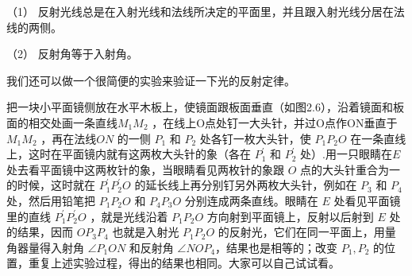 （1）
反射光线总是在入射光线和法线所决定的平面里，并且跟入射光线分居在法线的两侧。

（2） 反射角等于入射角。

我们还可以做一个很简便的实验来验证一下光的反射定律。

把一块小平面镜侧放在水平木板上，使镜面跟板面垂直（如图2.6），沿着镜面和板面的相交处画一条直线\(M_{1}M_{2}\)
，在线上O点处钉一大头针，并过O点作ON垂直于 \(M_{1}M_{2}\)
，再在法线\(ON\) 的一侧 \(P_{1}\) 和 \(P_{2}\) 处各钉一枚大头针，使
\(P_{1}P_{2}O\) 在一条直线上，这时在平面镜内就有这两枚大头针的象（各在
\(P_{1}^{\prime}\) 和 \(P_{2}^{\prime}\) 处）.用一只眼睛在\(E\)
处去看平面镜中这两枚针的象，当眼睛看见两枚针的象跟 \(O\)
点的大头针重合为一的时候，这时就在 \(P_{1}^{\prime}P_{2}^{\prime}O\)
的延长线上再分别钉另外两枚大头针，例如在 \(P_{3}\) 和 \(P_{4}\)
处，然后用铅笔把 \(P_{1}P_{2}O\) 和 \(P_{4}P_{3}O\)
分别连成两条直线。眼睛在 \(E\) 处看见平面镜里的直线
\(P_{1}^{\prime}P_{2}^{\prime}O\) ，就是光线沿着 \(P_{1}P_{2}O\)
方向射到平面镜上，反射以后射到 \(E\) 处的结果，因而 \(OP_{3}P_{4}\)
也就是入射光 \(P_{1}P_{2}O\)
的反射光，它们在同一平面上，用量角器量得入射角 \(\angle P_{1}ON\)
和反射角 \(\angle NOP_{4}\)，结果也是相等的；改变 \(P_{1}, P_{2}\)
的位置，重复上述实验过程，得出的结果也相同。大家可以自己试试看。

